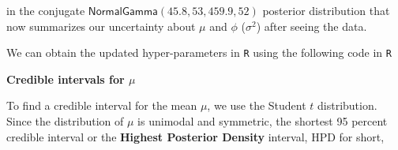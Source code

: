 \documentclass[]{book}
\newenvironment{Shaded}{\begin{snugshade}}{\end{snugshade}}
\newcommand{\KeywordTok}[1]{\textcolor[rgb]{0.13,0.29,0.53}{\textbf{#1}}}
\newcommand{\DecValTok}[1]{\textcolor[rgb]{0.00,0.00,0.81}{#1}}
\newcommand{\FloatTok}[1]{\textcolor[rgb]{0.00,0.00,0.81}{#1}}
\newcommand{\StringTok}[1]{\textcolor[rgb]{0.31,0.60,0.02}{#1}}
\newcommand{\CommentTok}[1]{\textcolor[rgb]{0.56,0.35,0.01}{\textit{#1}}}
\newcommand{\OperatorTok}[1]{\textcolor[rgb]{0.81,0.36,0.00}{\textbf{#1}}}
\newcommand{\NormalTok}[1]{#1}
\theoremstyle{definition}
\theoremstyle{definition}
\theoremstyle{definition}
\theoremstyle{remark}
\begin{document}
in the conjugate \(\textsf{NormalGamma}(45.8, 53, 459.9, 52)\) posterior
distribution that now summarizes our uncertainty about \(\mu\) and
\(\phi\) (\(\sigma^2\)) after seeing the data.

We can obtain the updated hyper-parameters in \texttt{R} using the
following code in \texttt{R}

\begin{Shaded}
\end{Shaded}

\textbf{Credible intervals for \(\mu\)}

To find a credible interval for the mean \(\mu\), we use the Student
\(t\) distribution. Since the distribution of \(\mu\) is unimodal and
symmetric, the shortest 95 percent credible interval or the
\textbf{Highest Posterior Density} interval, HPD for short,
\end{document}
